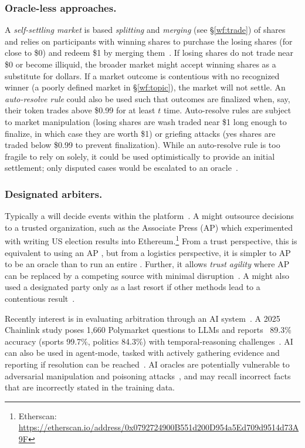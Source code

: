 \subsubsection{Oracle-less approaches.}

A \textit{self-settling market} is based \textit{splitting} and \textit{merging} (see \S\ref{wf:trade}) of shares and relies on participants with winning shares to purchase the losing shares (for close to \$0) and redeem \$1 by merging them~\cite{BMR17}. If losing shares do not trade near \$0 or become illiquid, the broader market might accept winning shares as a substitute for dollars. If a market outcome is contentious with no recognized winner (\eg a poorly defined market in \S\ref{wf:topic}), the market will not settle. An \textit{auto-resolve rule} could also be used such that outcomes are finalized when, say, their token trades above \$0.99 for at least $t$ time. Auto-resolve rules are subject to market manipulation (losing shares are wash traded near \$1 long enough to finalize, in which case they are worth \$1) or griefing attacks (yes shares are traded below \$0.99 to prevent finalization). While an auto-resolve rule is too fragile to rely on solely, it could be used optimistically to provide an initial settlement; only disputed cases would be escalated to an oracle~\cite{Aug15}. 

\subsubsection{Designated arbiters.}

Typically a \cepm will decide events within the platform~\cite{kalshi}. A \depm might outsource decisions to a trusted organization, such as the Associate Press (AP) which experimented with writing US election results into Ethereum.\footnote{Etherscan: \url{https://etherscan.io/address/0x0792724900B551d200D954a5Ed709d9514d73A9F}} From a trust perspective, this is equivalent to using an AP \cepm, but from a logistics perspective, it is simpler to AP to be an oracle than to run an entire \cepm. Further, it allows \textit{trust agility} where AP can be replaced by a competing source with minimal disruption~\cite{BCFKMN14}. A \depm might also used a designated party only as a last resort if other methods lead to a contentious result~\cite{Rey24}. 

Recently interest is in evaluating arbitration through an AI system~\cite{chaos}. A 2025 Chainlink study poses 1,660 Polymarket questions to LLMs and reports ~89.3\% accuracy (sports 99.7\%, politics 84.3\%)  with temporal-reasoning challenges~\cite{ZVW25}. AI can also be used in agent-mode, tasked with actively gathering evidence and reporting if resolution can be reached~\cite{chaos}. AI oracles are potentially vulnerable to adversarial manipulation and poisoning attacks~\cite{ZGWJ25}, and may recall incorrect facts that are incorrectly stated in the training data. 

